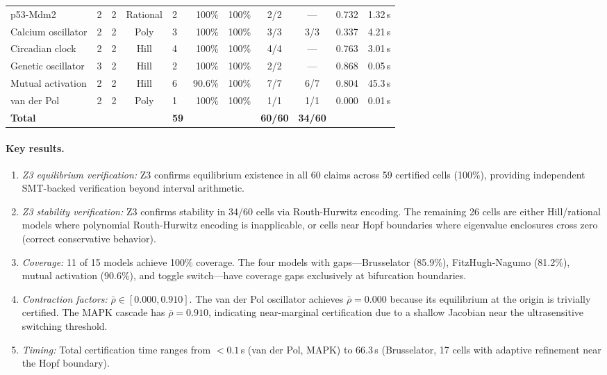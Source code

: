 \documentclass[11pt]{article}
\begin{document}
\begin{table}[t]
\begin{tabular}{@{}lccclrccccc@{}}
p53-Mdm2           & 2 & 2 & Rational & 2  & 100\%  & 100\% & 2/2   & ---    & 0.732 & 1.32\,s \\
Calcium oscillator & 2 & 2 & Poly     & 3  & 100\%  & 100\% & 3/3   & 3/3   & 0.337 & 4.21\,s \\
Circadian clock    & 2 & 2 & Hill     & 4  & 100\%  & 100\% & 4/4   & ---    & 0.763 & 3.01\,s \\
Genetic oscillator & 3 & 2 & Hill     & 2  & 100\%  & 100\% & 2/2   & ---    & 0.868 & 0.05\,s \\
Mutual activation  & 2 & 2 & Hill     & 6  & 90.6\% & 100\% & 7/7   & 6/7   & 0.804 & 45.3\,s \\
van der Pol        & 2 & 2 & Poly     & 1  & 100\%  & 100\% & 1/1   & 1/1   & 0.000 & 0.01\,s \\
\midrule
\textbf{Total}     &   &   &          & \textbf{59} & & & \textbf{60/60} & \textbf{34/60} & & \\
\bottomrule
\end{tabular}
\end{table}

\paragraph{Key results.}
\begin{enumerate}[leftmargin=*]
\item \emph{Z3 equilibrium verification:} Z3 confirms equilibrium existence in all 60 claims across 59 certified cells (100\%), providing independent SMT-backed verification beyond interval arithmetic.

\item \emph{Z3 stability verification:} Z3 confirms stability in 34/60 cells via Routh-Hurwitz encoding.  The remaining 26 cells are either Hill/rational models where polynomial Routh-Hurwitz encoding is inapplicable, or cells near Hopf boundaries where eigenvalue enclosures cross zero (correct conservative behavior).

\item \emph{Coverage:} 11 of 15 models achieve 100\% coverage.  The four models with gaps---Brusselator (85.9\%), FitzHugh-Nagumo (81.2\%), mutual activation (90.6\%), and toggle switch---have coverage gaps exclusively at bifurcation boundaries.

\item \emph{Contraction factors:} $\bar\rho \in [0.000, 0.910]$.  The van der Pol oscillator achieves $\bar\rho = 0.000$ because its equilibrium at the origin is trivially certified.  The MAPK cascade has $\bar\rho = 0.910$, indicating near-marginal certification due to a shallow Jacobian near the ultrasensitive switching threshold.

\item \emph{Timing:} Total certification time ranges from ${<}0.1$\,s (van der Pol, MAPK) to 66.3\,s (Brusselator, 17 cells with adaptive refinement near the Hopf boundary).
\end{enumerate}
\end{document}
